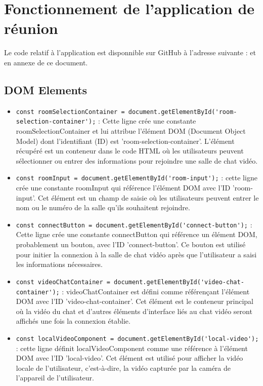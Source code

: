 \documentclass[12pt, a4paper, oneside]{article}
\begin{document}
\newpage

\section{Fonctionnement de l'application de réunion}

Le code relatif à l'application est disponnible sur GitHub à l'adresse suivante : et en annexe de ce document.

\subsection{DOM Elements}

\begin{itemize}
  \item \verb|const roomSelectionContainer = document.getElementById('room-selection-container');| : Cette ligne crée une constante roomSelectionContainer et lui attribue l'élément DOM (Document Object Model) dont l'identifiant (ID) est 'room-selection-container'. L'élément récupéré est un conteneur dans le code HTML où les utilisateurs peuvent sélectionner ou entrer des informations pour rejoindre une salle de chat vidéo.
  \item \verb|const roomInput = document.getElementById('room-input');| : cette ligne crée une constante roomInput qui référence l'élément DOM avec l'ID 'room-input'. Cet élément est un champ de saisie où les utilisateurs peuvent entrer le nom ou le numéro de la salle qu'ils souhaitent rejoindre.
  \item \verb|const connectButton = document.getElementById('connect-button');| :  Cette ligne crée une constante connectButton qui référence un élément DOM, probablement un bouton, avec l'ID 'connect-button'. Ce bouton est utilisé pour initier la connexion à la salle de chat vidéo après que l'utilisateur a saisi les informations nécessaires.
  \item \verb|const videoChatContainer = document.getElementById('video-chat-container');| : videoChatContainer est défini comme référençant l'élément DOM avec l'ID 'video-chat-container'. Cet élément est le conteneur principal où la vidéo du chat et d'autres éléments d'interface liés au chat vidéo seront affichés une fois la connexion établie.
  \item \verb|const localVideoComponent = document.getElementById('local-video');| :  cette ligne définit localVideoComponent comme une référence à l'élément DOM avec l'ID 'local-video'. Cet élément est utilisé pour afficher la vidéo locale de l'utilisateur, c'est-à-dire, la vidéo capturée par la caméra de l'appareil de l'utilisateur.
\end{itemize}
\end{document}

